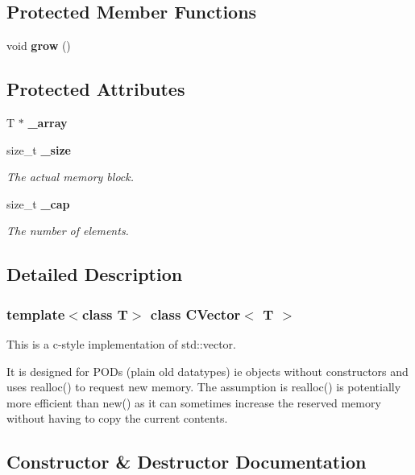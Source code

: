 \subsection*{Protected Member Functions}
\begin{CompactItemize}
\item 
void {\bf grow} ()
\end{CompactItemize}
\subsection*{Protected Attributes}
\begin{CompactItemize}
\item 
T $\ast$ {\bf \_\-array}
\item 
size\_\-t {\bf \_\-size}
\begin{CompactList}\small\item\em The actual memory block. \item\end{CompactList}\item 
size\_\-t {\bf \_\-cap}
\begin{CompactList}\small\item\em The number of elements. \item\end{CompactList}\end{CompactItemize}


\subsection{Detailed Description}
\subsubsection*{template$<$class T$>$ class CVector$<$ T $>$}

This is a c-style implementation of std::vector. 

It is designed for PODs (plain old datatypes) ie objects without constructors and uses realloc() to request new memory. The assumption is realloc() is potentially more efficient than new() as it can sometimes increase the reserved memory without having to copy the current contents. 



\subsection{Constructor \& Destructor Documentation}
